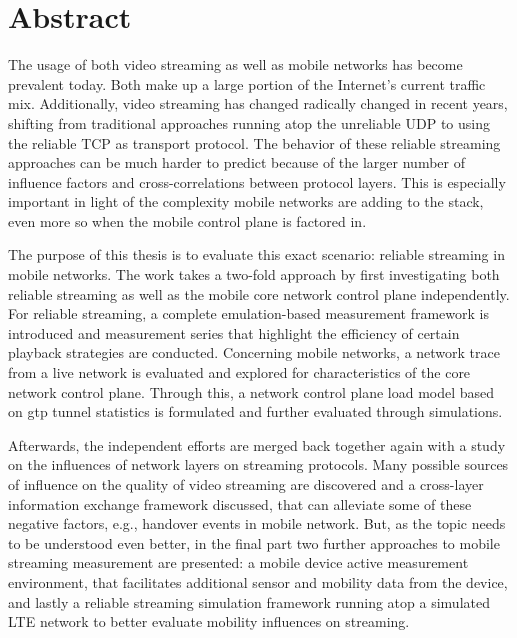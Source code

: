 \chapter*{Abstract}
%

The usage of both video streaming as well as mobile networks has become prevalent today. Both make up a large portion of the Internet's current traffic mix. Additionally, video streaming has changed radically changed in recent years, shifting from traditional approaches running atop the unreliable \acrshort{UDP} to using the reliable \acrshort{TCP} as transport protocol. The behavior of these reliable streaming approaches can be much harder to predict because of the larger number of influence factors and cross-correlations between protocol layers. This is especially important in light of the complexity mobile networks are adding to the stack, even more so when the mobile control plane is factored in.

The purpose of this thesis is to evaluate this exact scenario: reliable streaming in mobile networks. The work takes a two-fold approach by first investigating both reliable streaming as well as the mobile core network control plane independently. For reliable streaming, a complete emulation-based measurement framework is introduced and measurement series that highlight the efficiency of certain playback strategies are conducted. Concerning mobile networks, a network trace from a live network is evaluated and explored for characteristics of the core network control plane. Through this, a network control plane load model based on \acrshort{gtp} tunnel statistics is formulated and further evaluated through simulations.

Afterwards, the independent efforts are merged back together again with a study on the influences of network layers on streaming protocols. Many possible sources of influence on the quality of video streaming are discovered and a cross-layer information exchange framework discussed, that can alleviate some of these negative factors, e.g., handover events in mobile network. But, as the topic needs to be understood even better, in the final part two further approaches to mobile streaming measurement are presented: a mobile device active measurement environment, that facilitates additional sensor and mobility data from the device, and lastly a reliable streaming simulation framework running atop a simulated \acrshort{LTE} network to better evaluate mobility influences on streaming.

